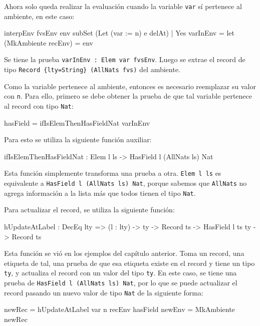 Ahora solo queda realizar la evaluación cuando la variable \texttt{var} sí pertenece al ambiente, en este caso:

\begin{code}
interpEnv {fvsEnv} env subSet (Let (var := n) e delAt) 
    | Yes varInEnv = 
    let
        (MkAmbiente recEnv) = env
\end{code}

Se tiene la prueba \texttt{varInEnv : Elem var fvsEnv}. Luego se extrae el record de tipo \texttt{Record \{lty=String\} (AllNats fvs)} del ambiente.

Como la variable pertenece al ambiente, entonces es necesario reemplazar su valor con \texttt{n}. Para ello, primero se debe obtener la prueba de que tal variable pertenece al record con tipo \texttt{Nat}:

\begin{code}
hasField = ifIsElemThenHasFieldNat varInEnv
\end{code}

Para esto se utiliza la siguiente función auxiliar:

\begin{code}
ifIsElemThenHasFieldNat : Elem l ls -> HasField l (AllNats ls) Nat
\end{code}

Esta función simplemente transforma una prueba a otra. \texttt{Elem l ls} es equivalente a \texttt{HasField l (AllNats ls) Nat}, porque sabemos que \texttt{AllNats} no agrega información a la lista más que todos tienen el tipo \texttt{Nat}.

Para actualizar el record, se utiliza la siguiente función:

\begin{code}
hUpdateAtLabel : DecEq lty => (l : lty) ->
  ty -> Record ts -> HasField l ts ty -> Record ts
\end{code}

Esta función se vió en los ejemplos del capítulo anterior. Toma un record, una etiqueta de tal, una prueba de que esa etiqueta existe en el record y tiene un tipo \texttt{ty}, y actualiza el record con un valor del tipo \texttt{ty}. En este caso, se tiene una prueba de \texttt{HasField l (AllNats ls) Nat}, por lo que se puede actualizar el record pasando un nuevo valor de tipo \texttt{Nat} de la siguiente forma:

\begin{code}
newRec = hUpdateAtLabel var n recEnv hasField
newEnv = MkAmbiente newRec
\end{code}

